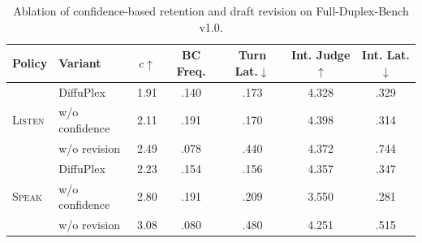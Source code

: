 \begin{table}[t]
\caption{
Ablation of confidence-based retention and draft revision on Full-Duplex-Bench v1.0.
}
\label{tab:inference_ablation}
\centering
\small
\setlength{\tabcolsep}{3.5pt}
\renewcommand{\arraystretch}{1.03}
\begin{tabular}{llccccc}
\toprule
Policy & Variant
& $c\uparrow$
& BC Freq.
& Turn Lat.$\downarrow$
& Int. Judge$\uparrow$
& Int. Lat.$\downarrow$ \\
\midrule
\multirow{3}{*}{\textsc{Listen}}
& DiffuPlex
& 1.91 & .140 & .173 & 4.328 & .329 \\
& w/o confidence
& 2.11 & .191 & .170 & 4.398 & .314 \\
& w/o revision
& 2.49 & .078 & .440 & 4.372 & .744 \\
\midrule
\multirow{3}{*}{\textsc{Speak}}
& DiffuPlex
& 2.23 & .154 & .156 & 4.357 & .347 \\
& w/o confidence
& 2.80 & .191 & .209 & 3.550 & .281 \\
& w/o revision
& 3.08 & .080 & .480 & 4.251 & .515 \\
\bottomrule
\end{tabular}
\end{table}